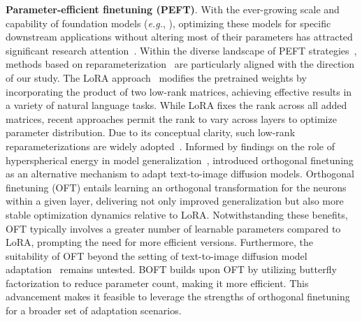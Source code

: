 \textbf{Parameter-efficient finetuning (PEFT)}. With the ever-growing scale and capability of foundation models (\emph{e.g.}, \cite{brown2020language,radford2021learning,rombach2022high,kirillov2023segment}), optimizing these models for specific downstream applications without altering most of their parameters has attracted significant research attention~\cite{treviso2023efficient,ding2023parameter,lialin2023scaling}. Within the diverse landscape of PEFT strategies~\cite{houlsby2019parameter,aghajanyan2020intrinsic,hulora2022,edalati2022krona,wang2022adamix,gheini2021cross,zaken2022bitfit,guo2020parameter,sung2021training,ansell2022composable,lester2021power,li2021prefix,vu2022spot,he2021towards,mao2021unipelt,karimi2021compacter,liu2022few,sung2022lst,chen2022parameter,jia2022visual,chen2022adaptformer,zhang2022neural,jie2023fact,lian2022scaling,luo2023towards}, methods based on reparameterization~\cite{aghajanyan2020intrinsic,hulora2022,edalati2022krona} are particularly aligned with the direction of our study. The LoRA approach~\cite{hulora2022} modifies the pretrained weights by incorporating the product of two low-rank matrices, achieving effective results in a variety of natural language tasks. While LoRA fixes the rank across all added matrices, recent approaches \cite{zhang2022adaptive,valipour2022dylora,zhang2023increlora} permit the rank to vary across layers to optimize parameter distribution. Due to its conceptual clarity, such low-rank reparameterizations are widely adopted~\cite{dettmers2023qlora,zi2023delta,chavan2023one}. Informed by findings on the role of hyperspherical energy in model generalization~\cite{liu2018learning,liu2021orthogonal}, \cite{qiu2023controlling} introduced orthogonal finetuning as an alternative mechanism to adapt text-to-image diffusion models. Orthogonal finetuning (OFT) entails learning an orthogonal transformation for the neurons within a given layer, delivering not only improved generalization but also more stable optimization dynamics relative to LoRA. Notwithstanding these benefits, OFT typically involves a greater number of learnable parameters compared to LoRA, prompting the need for more efficient versions. Furthermore, the suitability of OFT beyond the setting of text-to-image diffusion model adaptation~\cite{qiu2023controlling} remains untested. BOFT builds upon OFT by utilizing butterfly factorization to reduce parameter count, making it more efficient. This advancement makes it feasible to leverage the strengths of orthogonal finetuning for a broader set of adaptation scenarios.

